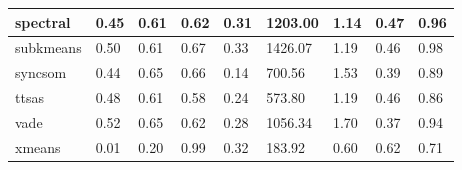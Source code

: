 \begin{table}[H]
\begin{tabular}{|l|l|l|l|l|l|l|l|l|}
\hline
spectral & 0.45 & 0.61 & 0.62 & 0.31 & 1203.00 & 1.14 & 0.47 & 0.96 \\
\hline
subkmeans & 0.50 & 0.61 & 0.67 & 0.33 & 1426.07 & 1.19 & 0.46 & 0.98 \\
\hline
syncsom & 0.44 & 0.65 & 0.66 & 0.14 & 700.56 & 1.53 & 0.39 & 0.89 \\
\hline
ttsas & 0.48 & 0.61 & 0.58 & 0.24 & 573.80 & 1.19 & 0.46 & 0.86 \\
\hline
vade & 0.52 & 0.65 & 0.62 & 0.28 & 1056.34 & 1.70 & 0.37 & 0.94 \\
\hline
xmeans & 0.01 & 0.20 & 0.99 & 0.32 & 183.92 & 0.60 & 0.62 & 0.71 \\
\hline
\end{tabular}
\end{table}